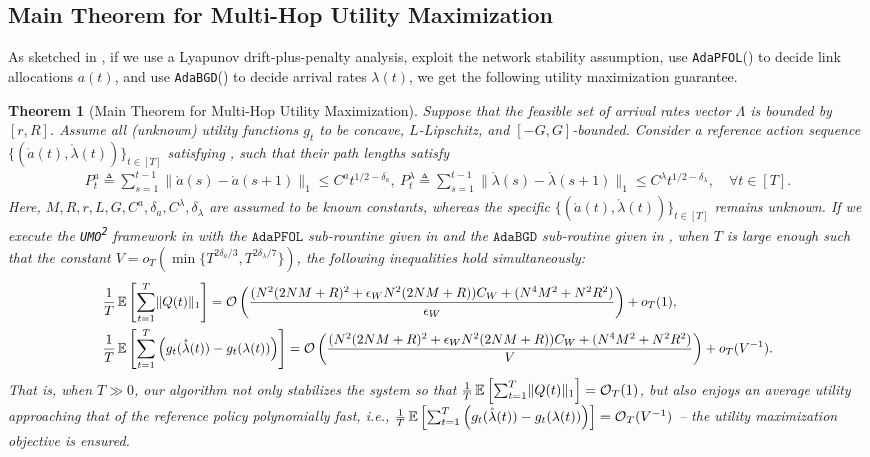 \documentclass[11pt,fullpage,letterpaper]{article} %
\newtheorem{theorem}{Theorem}[section]
\renewcommand{\bm}[1]{#1}%
\renewcommand{\O}{\operatorname{\mathcal O}}
\newcommand{\E}{\operatornamewithlimits{\mathbb{E}}}
\newcommand{\UMAlg}{\texttt{UMO}\textsuperscript{\texttt{2}}\xspace}
\newcommand{\OLOAlg}{\texttt{AdaPFOL}\xspace}
\newcommand{\BCOAlg}{\texttt{AdaBGD}\xspace}
\newcommand{\OLO}{\OLOAlg}
\newcommand{\BCO}{\BCOAlg}
\newcommand\scalemath[2]{\scalebox{#1}{\mbox{\ensuremath{\displaystyle #2}}}}
\begin{document}
\subsection{Main Theorem for Multi-Hop Utility Maximization}\label{sec:multi-hop utility main theorem}
As sketched in , if we use a Lyapunov drift-plus-penalty analysis, exploit the network stability assumption, use \OLOAlg () to decide link allocations $\bm a(t)$, and use \BCOAlg () to decide arrival rates $\bm \lambda(t)$, we get the following utility maximization guarantee.
\begin{theorem}[Main Theorem for Multi-Hop Utility Maximization]\label{thm:multi-hop utility main theorem}
Suppose that the feasible set of arrival rates vector $\Lambda$ is bounded by $[r,R]$.
Assume all (unknown) utility functions $g_t$ to be concave, $L$-Lipschitz, and $[-G,G]$-bounded.
Consider a reference action sequence $\{(\mathring{\bm a}(t),\mathring{\bm \lambda}(t))\}_{t\in [T]}$ satisfying , such that their path lengths satisfy
\begin{align*}
P_t^a\triangleq \sum_{s=1}^{t-1} \lVert \mathring{\bm a}(s)-\mathring{\bm a}(s+1)\rVert_1\le C^a t^{1/2-\delta_a},~P_t^\lambda\triangleq \sum_{s=1}^{t-1} \lVert \mathring{\bm \lambda}(s)-\mathring{\bm \lambda}(s+1)\rVert_1\le C^\lambda t^{1/2 - \delta_\lambda},\quad \forall t\in [T].
\end{align*}
Here, $M,R,r,L,G,C^a,\delta_a,C^\lambda,\delta_\lambda$ are assumed to be known constants, whereas the specific $\{(\mathring{\bm a}(t),\mathring{\bm \lambda}(t))\}_{t\in [T]}$ remains unknown.
If we execute the \UMAlg framework in  with the $\OLO$ sub-rountine given in  and the $\BCO$ sub-routine given in , when $T$ is large enough such that the constant $V=o_T(\min\{T^{2\delta_a/3},T^{2\delta_\lambda/7}\})$, the following inequalities hold simultaneously:
\begin{align*}
&\scalemath{0.95}{\frac 1T \E\left [\sum_{t=1}^T \lVert \bm Q(t)\rVert_1\right ]=\O\left (\frac{(N^2 (2NM+R)^2 + \epsilon_W N^2 (2NM+R)) C_W + (N^4 M^2+N^2 R^2)}{\epsilon_W}\right ) + o_T(1),}\\
&\scalemath{0.95}{\frac 1T \E\left [\sum_{t=1}^T \left (g_{t}(\mathring{\bm \lambda}(t)) - g_{t}(\bm \lambda(t))\right )\right ]=\O\left (\frac{(N^2 (2NM+R)^2 + \epsilon_W N^2 (2NM+R)) C_W + (N^4 M^2+N^2 R^2)}{V}\right ) + o_T(V^{-1}).}
\end{align*}
That is, when $T\gg 0$, our algorithm not only stabilizes the system so that $\frac 1T \E\left [\sum_{t=1}^T \lVert \bm Q(t)\rVert_1\right ]=\O_T(1)$, but also enjoys an average utility approaching that of the reference policy polynomially fast, \textit{i.e.}, $\frac 1T \E\left [\sum_{t=1}^T \left (g_{t}(\mathring{\bm \lambda}(t)) - g_{t}(\bm \lambda(t))\right )\right ]=\O_T(V^{-1})$ -- the utility maximization objective  is ensured.
\end{theorem}
\end{document}
